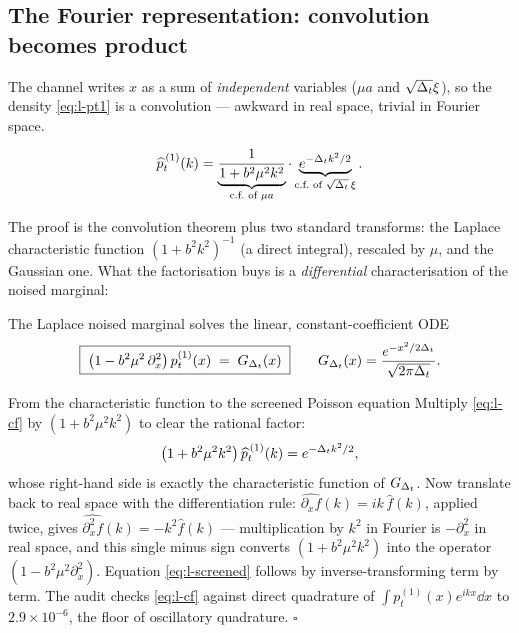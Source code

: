 \subsection{The Fourier representation: convolution becomes product}
\label{sec:l-fourier}

The channel writes $x$ as a sum of \emph{independent} variables
($\mu a$ and $\sqrt{\Delta_t}\xi$), so the density \eqref{eq:l-pt1} is a
convolution --- awkward in real space, trivial in Fourier space.

\begin{proposition}\label{prop:l-cf}
\begin{equation}
  \widehat{p}_t^{\,(1)}(k)
  = \underbrace{\frac{1}{1 + b^2 \mu^2 k^2}}_{\text{c.f.\ of } \mu a}
    \cdot
    \underbrace{e^{-\Delta_t k^2/2}}_{\text{c.f.\ of } \sqrt{\Delta_t}\,\xi} .
  \label{eq:l-cf}
\end{equation}
\end{proposition}

The proof is the convolution theorem plus two standard transforms: the
Laplace characteristic function $(1 + b^2 k^2)^{-1}$ (a direct integral),
rescaled by $\mu$, and the Gaussian one. What the factorisation buys is a
\emph{differential} characterisation of the noised marginal:

\begin{theorem}\label{thm:l-screened}
The Laplace noised marginal solves the linear, constant-coefficient ODE
\begin{equation}
  \boxed{\;
  \big( 1 - b^2 \mu^2\, \partial_x^2 \big)\, p_t^{(1)}(x)
  \;=\; G_{\Delta_t}(x)
  \;}
  \qquad
  G_{\Delta_t}(x) = \frac{e^{-x^2/2\Delta_t}}{\sqrt{2\pi \Delta_t}} .
  \label{eq:l-screened}
\end{equation}
\end{theorem}

\begin{toolbox}{From the characteristic function to the screened Poisson
equation}
Multiply \eqref{eq:l-cf} by $(1 + b^2\mu^2 k^2)$ to clear the rational
factor:
\begin{equation*}
  \big( 1 + b^2 \mu^2 k^2 \big)\, \widehat{p}_t^{\,(1)}(k)
  = e^{-\Delta_t k^2 / 2},
\end{equation*}
whose right-hand side is exactly the characteristic function of
$G_{\Delta_t}$. Now translate back to real space with the differentiation
rule: $\widehat{\partial_x f}(k) = ik\,\widehat f(k)$, applied twice, gives
$\widehat{\partial_x^2 f}(k) = -k^2 \widehat f(k)$ --- multiplication by
$k^2$ in Fourier is $-\partial_x^2$ in real space, and this single minus
sign converts $(1 + b^2\mu^2 k^2)$ into the operator
$(1 - b^2\mu^2 \partial_x^2)$. Equation \eqref{eq:l-screened} follows by
inverse-transforming term by term. The audit checks \eqref{eq:l-cf} against
direct quadrature of $\int p_t^{(1)}(x) e^{ikx} \dd x$ to
$2.9 \times 10^{-6}$, the floor of oscillatory quadrature.
\hfill$\square$
\end{toolbox}

